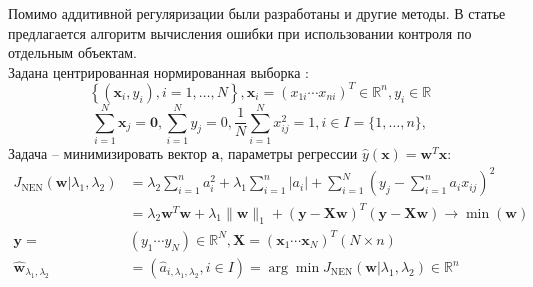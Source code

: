 \documentclass[12pt, twoside]{article}
\newcommand{\wm}{{\mathbf{w}}}
\begin{document}
Помимо аддитивной регуляризации были разработаны и другие методы. В статье \cite{chernousova2014linear} предлагается алгоритм вычисления ошибки при использовании контроля по отдельным объектам.\\
Задана центрированная нормированная выборка :
\begin{equation}\label{f1}
\left\{\left(\mathbf{x}_{i}, y_{i}\right), i=1, \ldots, N\right\}, \mathbf{x}_{i}=\left(x_{1 i} \cdots x_{n i}\right)^{T} \in \mathbb{R}^{n}, y_{i} \in \mathbb{R}
\end{equation}
\begin{equation}
\sum_{i=1}^{N} \mathbf{x}_{j}=\mathbf{0}, \sum_{i=1}^{N} y_{j}=0, \frac{1}{N} \sum_{i=1}^{N} x_{i j}^{2}=1, i \in I=\{1, \ldots, n\},
\end{equation}
 Задача -- минимизировать вектор \textbf{a}, параметры регрессии $\hat{y}(\mathbf{x})=\wm^{T} \mathbf{x}$:
\begin{equation}
\begin{aligned} J_{\mathrm{NEN}}\left(\wm | \lambda_{1}, \lambda_{2}\right) &=\lambda_{2} \sum_{i=1}^{n} a_{i}^{2}+\lambda_{1} \sum_{i=1}^{n}\left|a_{i}\right|+\sum_{i=1}^{N}\left(y_{j}-\sum_{i=1}^{n} a_{i} x_{i j}\right)^{2} \\ &=\lambda_{2} \wm^{T} \wm+\lambda_{1}\|\wm\|_{1}+(\mathbf{y}-\mathbf{X} \wm)^{T}(\mathbf{y}-\mathbf{X} \wm) \rightarrow \min (\wm) \\ \mathbf{y}=&\left(y_{1} \cdots y_{N}\right) \in \mathbb{R}^{N}, \mathbf{X}=\left(\mathbf{x}_{1} \cdots \mathbf{x}_{N}\right)^{T}(N \times n) \\ \hat{\wm}_{\lambda_{1}, \lambda_{2}} &=\left(\hat{a}_{i, \lambda_{1}, \lambda_{2}}, i \in I\right)=\arg \min J_{\mathrm{NEN}}\left(\wm | \lambda_{1}, \lambda_{2}\right) \in \mathbb{R}^{n} \end{aligned}
\end{equation}
\end{document}
